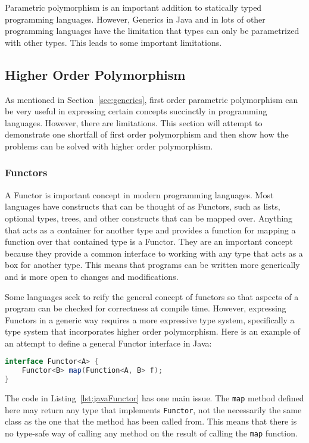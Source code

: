 Parametric polymorphism is an important addition to statically typed programming
languages. However, Generics in Java and in lots of other programming languages
have the limitation that types can only be parametrized with other types. 
This leads to some important limitations.

\subsection{Higher Order Polymorphism}
As mentioned in Section~\ref{sec:generics}, first order parametric polymorphism
can be very useful in expressing certain concepts succinctly in programming 
languages. However, there are limitations. This section will attempt to 
demonstrate one shortfall of first order polymorphism and then show how the
problems can be solved with higher order polymorphism.

\subsubsection{Functors}
A Functor is important concept in modern programming languages. Most languages
have constructs that can be thought of as Functors, such as lists, optional types,
trees, and other constructs that can be mapped over. Anything that acts as a
container for another type and provides a function for mapping a function over
that contained type is a Functor. They are an important concept because they
provide a common interface to working with any type that acts as a box for
another type. This means that programs can be written more generically and is
more open to changes and modifications.

Some languages seek to reify the general concept of functors so that aspects of a program 
can be checked for correctness at compile time. However, expressing Functors in
a generic way requires a more expressive type system, specifically a type system
that incorporates higher order polymorphism. Here is an example of an attempt
to define a general Functor interface in Java:

\begin{lstlisting}[caption=An attempt to define Functor in Java, language=Java, label={lst:javaFunctor}]
interface Functor<A> {
    Functor<B> map(Function<A, B> f);
}
\end{lstlisting}

The code in Listing~\ref{lst:javaFunctor} has one main issue. The \lstinline{map}
method defined here may return any type that implements \lstinline{Functor},
not the necessarily the same class as the one that the method has been called
from. This means that there is no type-safe way of calling any method on the
result of calling the \lstinline{map} function.

